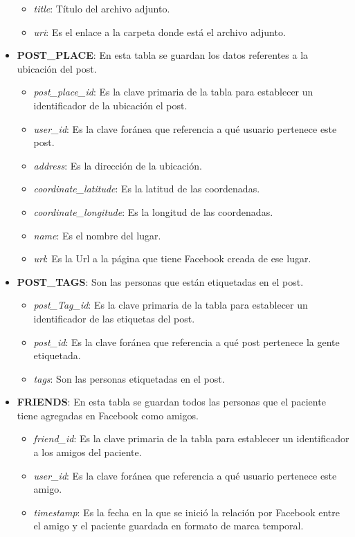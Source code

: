\begin{itemize}
\begin{itemize}
		\item \textit{ title}: Título del archivo adjunto.
		\item \textit{ uri}: Es el enlace a la carpeta donde está el archivo adjunto.
	\end{itemize}
	\item \textbf{ POST\_PLACE}: En esta tabla se guardan los datos referentes a la ubicación del post.
	\begin{itemize}
		\item \textit{ post\_place\_id}: Es la clave primaria de la tabla para establecer un identificador de la ubicación el post.
		\item \textit{ user\_id}: Es la clave foránea que referencia a qué usuario pertenece este post.
		\item \textit{ address}: Es la dirección de la ubicación.
		\item \textit{ coordinate\_latitude}: Es la latitud de las coordenadas.
		\item \textit{ coordinate\_longitude}: Es la longitud de las coordenadas.
		\item \textit{ name}: Es el nombre del lugar.
		\item \textit{ url}: Es la Url a la página que tiene Facebook creada de ese lugar.
	\end{itemize}
	\item \textbf{ POST\_TAGS}: Son las personas que están etiquetadas en el post.
	\begin{itemize}
		\item \textit{ post\_Tag\_id}: Es la clave primaria de la tabla para establecer un identificador de las etiquetas del post.
		\item \textit{ post\_id}: Es la clave foránea que referencia a qué post pertenece la gente etiquetada.
		\item \textit{ tags}: Son las personas etiquetadas en el post.
	\end{itemize}
	\item \textbf{ FRIENDS}: En esta tabla se guardan todos las personas que el paciente tiene agregadas en Facebook como amigos.
	\begin{itemize}
		\item \textit{ friend\_id}: Es la clave primaria de la tabla para establecer un identificador a los amigos del paciente.
		\item \textit{ user\_id}: Es la clave foránea que referencia a qué usuario pertenece este amigo.
		\item \textit{ timestamp}: Es la fecha en la que se inició la relación por Facebook entre el amigo y el paciente guardada en formato de marca temporal.

\end{itemize}
\end{itemize}
